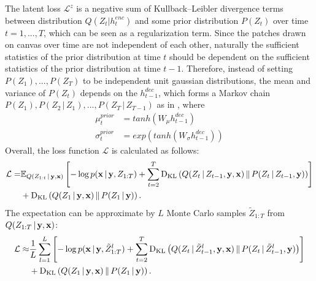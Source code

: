\documentclass{article} %
\newcommand{\comm}[1]{}
\newcommand{\given}{\,|\,}
\newcommand{\expectation}{\mathbb{E}}
\newcommand{\kldiv}{\mathrm{D}_{\rm KL}}
\newcommand{\klBars}{\,\|\,}
\newcommand{\hdec}{h^{dec}}
\newcommand{\henc}{h^{enc}}
\newcommand{\Lat}{Z}
\newcommand{\numSamples}{L}
\newcommand{\sampleIdx}{l}
\newcommand{\LatSample}{\tilde{Z}}
\newcommand{\icaption}{{\bf{y}}}
\newcommand{\oimage}{{\bf{x}}}
\newcommand{\post}{Q}
\newcommand{\prior}{P}
\newcommand{\loss}{\mathcal{L}}
\newcommand{\lloss}{\mathcal{L}^{z}}
\begin{document}
The latent loss $\lloss$ is a negative sum of Kullback--Leibler divergence terms between distribution $\post(\Lat_t|\henc_t)$ and some prior distribution ${\prior(\Lat_t)}$ over time $t=1,...,T$, which can be seen as a regularization term. Since the patches drawn on canvas over time are not independent of each other, naturally the sufficient statistics of the prior distribution at time $t$ should be dependent on the sufficient statistics of the prior distribution at time $t-1$. Therefore, instead of setting $\prior(\Lat_1), ..., \prior(\Lat_T)$ to be independent unit gaussian distributions, the mean and variance of $\prior(\Lat_t)$ depends on the $\hdec_{t-1}$, which forms a Markov chain $\prior(\Lat_1), \prior(\Lat_2\given\Lat_1), ..., \prior(\Lat_T\given\Lat_{T-1})$ as in \citep{bachman_sdm}, where 
\begin{align}
\mu_{t}^{prior} &= tanh(W_{\mu}\hdec_{t-1})\\
\sigma_{t}^{prior} &= exp(tanh(W_{\sigma}\hdec_{t-1})) 
\end{align}
Overall, the loss function $\loss$ is calculated as follows:
\begin{align}
\loss =  &\expectation_{Q(\Lat_{1:t}\given\icaption,\oimage)}\left[ - \log p(\oimage\given\icaption,\Lat_{1:T}) + \sum_{t=2}^T\kldiv\left(\post(\Lat_t\given\Lat_{t-1},\icaption,\oimage)\klBars\prior(\Lat_t\given\Lat_{t-1},\icaption)\right) \right] \nonumber \\& + \kldiv\left(\post(\Lat_1\given\icaption,\oimage)\klBars\prior(\Lat_1\given\icaption)\right).
\end{align}
The expectation can be approximate by $\numSamples$ Monte Carlo samples $\LatSample_{1:T}$ from $\post(\Lat_{1:T}\given\icaption, \oimage)$:
\begin{align}
\loss \approx  &\frac{1}{\numSamples}\sum_{\sampleIdx=1}^\numSamples\left[ - \log p(\oimage\given\icaption,\LatSample^\sampleIdx_{1:T}) + \sum_{t=2}^T\kldiv\left(\post(\Lat_t\given\LatSample^\sampleIdx_{t-1},\icaption,\oimage)\klBars\prior(\Lat_t\given\LatSample^\sampleIdx_{t-1},\icaption)\right) \right] \nonumber \\& + \kldiv\left(\post(\Lat_1\given\icaption,\oimage)\klBars\prior(\Lat_1\given\icaption)\right).
\end{align}
\comm{
\begin{align}
\loss &= -\sum_{t=1}^{T}D_{KL}(\post(\Lat_t|\henc_t,s_{t-1})\,||\,\prior(\Lat_t)) + \frac{1}{L}\sum_{l=1}^{L}log\,p(x_{t}|y,z)\\
&=
\frac{1}{2}\sum_{t=1}^{T}(1 - 2\,log\,\sigma_{t}^{prior} + 2\,log\,\sigma_{t} - \frac{exp(2\,log\,\sigma_{t}) + (\mu_{t} - \mu_{t}^{prior})^{2}}{exp(2\,log\,\sigma_{t}^{prior})}) + \frac{1}{L}\sum_{l=1}^{L}log\,p(x_{t}|y,z)
\end{align}
}
\end{document}
